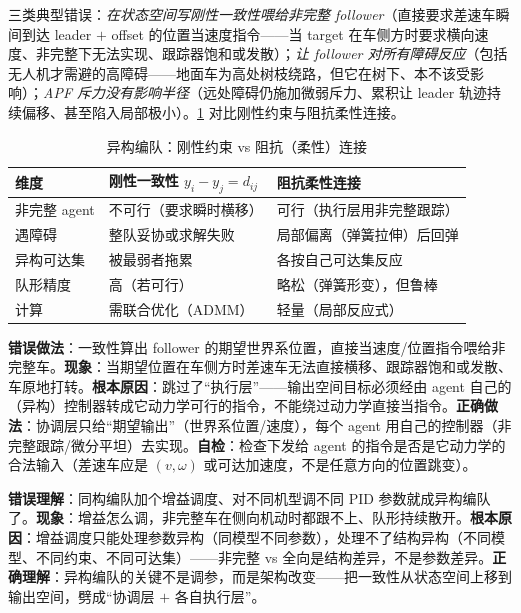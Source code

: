 \noindent 三类典型错误：\emph{在状态空间写刚性一致性喂给非完整 follower}（直接要求差速车瞬间到达 leader $+$ offset 的位置当速度指令——当 target 在车侧方时要求横向速度、非完整下无法实现、跟踪器饱和或发散）；\emph{让 follower 对所有障碍反应}（包括无人机才需避的高障碍——地面车为高处树枝绕路，但它在树下、本不该受影响）；\emph{APF 斥力没有影响半径}（远处障碍仍施加微弱斥力、累积让 leader 轨迹持续偏移、甚至陷入局部极小）。\cref{tab:hmr-rigid-soft} 对比刚性约束与阻抗柔性连接。

\begin{table}[H]\centering\small
\caption{异构编队：刚性约束 vs 阻抗（柔性）连接}
\label{tab:hmr-rigid-soft}
\begin{tabular}{lll}
\toprule
维度 & 刚性一致性 $y_i-y_j=d_{ij}$ & 阻抗柔性连接 \\
\midrule
非完整 agent & 不可行（要求瞬时横移） & 可行（执行层用非完整跟踪） \\
遇障碍 & 整队妥协或求解失败 & 局部偏离（弹簧拉伸）后回弹 \\
异构可达集 & 被最弱者拖累 & 各按自己可达集反应 \\
队形精度 & 高（若可行） & 略松（弹簧形变），但鲁棒 \\
计算 & 需联合优化（ADMM） & 轻量（局部反应式） \\
\bottomrule
\end{tabular}
\end{table}

\begin{pitfall}
\textbf{错误做法}：一致性算出 follower 的期望世界系位置，直接当速度/位置指令喂给非完整车。\textbf{现象}：当期望位置在车侧方时差速车无法直接横移、跟踪器饱和或发散、车原地打转。\textbf{根本原因}：跳过了“执行层”——输出空间目标必须经由 agent 自己的（异构）控制器转成它动力学可行的指令，不能绕过动力学直接当指令。\textbf{正确做法}：协调层只给“期望输出”（世界系位置/速度），每个 agent 用自己的控制器（非完整跟踪/微分平坦）去实现。\textbf{自检}：检查下发给 agent 的指令是否是它动力学的合法输入（差速车应是 $(v,\omega)$ 或可达加速度，不是任意方向的位置跳变）。
\end{pitfall}

\begin{pitfall}
\textbf{错误理解}：同构编队加个增益调度、对不同机型调不同 PID 参数就成异构编队了。\textbf{现象}：增益怎么调，非完整车在侧向机动时都跟不上、队形持续散开。\textbf{根本原因}：增益调度只能处理参数异构（同模型不同参数），处理不了结构异构（不同模型、不同约束、不同可达集）——非完整 vs 全向是结构差异，不是参数差异。\textbf{正确理解}：异构编队的关键不是调参，而是架构改变——把一致性从状态空间上移到输出空间，劈成“协调层 $+$ 各自执行层”。
\end{pitfall}

